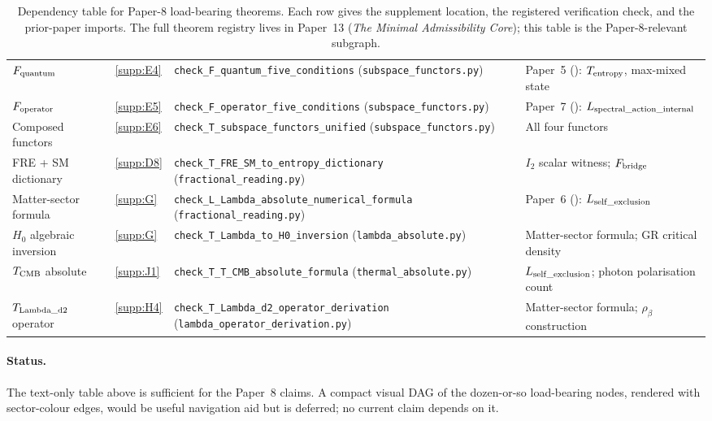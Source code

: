 \documentclass[11pt]{article}
\theoremstyle{plain}
\theoremstyle{definition}
\theoremstyle{remark}
\newcommand{\paperref}[2]{Paper~#1 (\emph{#2})}
\begin{document}
\begin{table}[h]
\begin{tabularx}{\textwidth}{@{}l l X X@{}}
$F_{\rm quantum}$                   & \ref{supp:E4} & \texttt{check\_F\_quantum\_five\_conditions} (\texttt{subspace\_functors.py}) & \paperref{5}{}: $T_{\rm entropy}$, max-mixed state \\
$F_{\rm operator}$                  & \ref{supp:E5} & \texttt{check\_F\_operator\_five\_conditions} (\texttt{subspace\_functors.py}) & \paperref{7}{}: $L_{\rm spectral\_action\_internal}$ \\
Composed functors                   & \ref{supp:E6} & \texttt{check\_T\_subspace\_functors\_unified} (\texttt{subspace\_functors.py}) & All four functors \\
\addlinespace[3pt]
FRE + SM dictionary                 & \ref{supp:D8} & \texttt{check\_T\_FRE\_SM\_to\_entropy\_dictionary} (\texttt{fractional\_reading.py}) & $I_2$ scalar witness; $F_{\rm bridge}$ \\
Matter-sector formula               & \ref{supp:G} & \texttt{check\_L\_Lambda\_absolute\_numerical\_formula} (\texttt{fractional\_reading.py}) & \paperref{6}{}: $L_{\rm self\_exclusion}$ \\
$H_0$ algebraic inversion           & \ref{supp:G} & \texttt{check\_T\_Lambda\_to\_H0\_inversion} (\texttt{lambda\_absolute.py}) & Matter-sector formula; GR critical density \\
$T_{\rm CMB}$ absolute               & \ref{supp:J1} & \texttt{check\_T\_T\_CMB\_absolute\_formula} (\texttt{thermal\_absolute.py}) & $L_{\rm self\_exclusion}$; photon polarisation count \\
$T_{\rm Lambda\_d2}$ operator       & \ref{supp:H4} & \texttt{check\_T\_Lambda\_d2\_operator\_derivation} (\texttt{lambda\_operator\_derivation.py}) & Matter-sector formula; $\rho_\beta$ construction \\
\bottomrule
\end{tabularx}
\caption{Dependency table for Paper-8 load-bearing theorems.  Each row gives the supplement location, the registered verification check, and the prior-paper imports.  The full theorem registry lives in \paperref{13}{The Minimal Admissibility Core}; this table is the Paper-8-relevant subgraph.}\label{tab:supp_dependency}
\end{table}

\paragraph{Status.}  The text-only table above is sufficient for the Paper~8 claims.  A compact visual DAG of the dozen-or-so load-bearing nodes, rendered with sector-colour edges, would be useful navigation aid but is deferred; no current claim depends on it.
\end{document}
